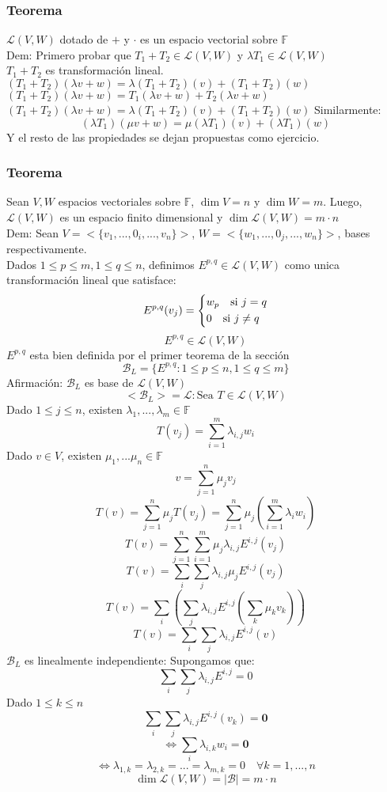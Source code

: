 \documentclass[11pt]{book}
\renewcommand{\vec}[1]{\mathbf{#1}}
\theoremstyle{definition}
\begin{document}
\subsubsection{Teorema}
$\mathcal{L}(V,W)$ dotado de $+$ y $\cdot$ es un espacio vectorial sobre $\mathbb{F}$\\
Dem: Primero probar que $T_1+T_2\in\mathcal{L}(V,W)$ y $\lambda T_1\in\mathcal{L}(V,W)$\\
$T_1+T_2$ es transformación lineal.\\
$(T_1+T_2)(\lambda v+w)=\lambda(T_1+T_2)(v)+(T_1+T_2)(w)$
$(T_1+T_2)(\lambda v+w)=T_1(\lambda v+w)+T_2(\lambda v+w)$
$(T_1+T_2)(\lambda v+w)=\lambda(T_1+T_2)(v)+(T_1+T_2)(w)$
Similarmente:
\[
(\lambda T_1)(\mu v+w)=\mu(\lambda T_1)(v)+(\lambda T_1)(w)
\]
Y el resto de las propiedades se dejan propuestas como ejercicio.
\subsubsection{Teorema}
Sean $V,W$ espacios vectoriales sobre $\mathbb{F}$, $\dim V=n$ y $\dim W=m$. Luego, $\mathcal{L}(V,W)$ es un espacio finito dimensional y $\dim\mathcal{L}(V,W)=m\cdot n$\\
Dem: Sean $V=<\{v_1,...,0_i,...,v_n\}>$, $W=<\{w_1,...,0_j,...,w_n\}>$, bases respectivamente.\\
Dados $1\leq p\leq m, 1\leq q\leq n$, definimos $E^{p,q}\in\mathcal{L}(V,W)$ como unica transformación lineal que satisface:
\[
E^{p,q}(v_j)=
\begin{dcases}
	w_p\quad\textrm{si }j=q\\
	0\quad\textrm{si } j\neq q
\end{dcases}
\]
\[
E^{p,q}\in\mathcal{L}(V,W)
\]
$E^{p,q}$ esta bien definida por el primer teorema de la sección
\[
\mathcal{B}_L=\{E^{p,q}:1\leq p\leq n,1\leq q\leq m\}
\]
Afirmación: $\mathcal{B}_L$ es base de $\mathcal{L}(V,W)$
\[
<\mathcal{B}_L>=\mathcal{L}:\textrm{Sea }T\in\mathcal{L}(V,W)
\]
Dado $1\leq j\leq n$, existen $\lambda_1,...,\lambda_m\in\mathbb{F}$
\[
T(v_j)=\sum^m_{i=1}\lambda_{i,j}w_i
\]
Dado $v\in V$, existen $\mu_1,...\mu_n\in\mathbb{F}$
\[
v=\sum^n_{j=1}\mu_jv_j
\]
\[
T(v)=\sum^n_{j=1}\mu_jT(v_j)=\sum^n_{j=1}\mu_j(\sum^m_{i=1}\lambda_iw_i)
\]
\[
T(v)=\sum^n_{j=1}\sum^m_{i=1}\mu_j\lambda_{i,j}E^{i,j}(v_j)
\]
\[
T(v)=\sum_i\sum_j\lambda_{i,j}\mu_jE^{i,j}(v_j)
\]
\[
T(v)=\sum_i\left(\sum_j\lambda_{i,j}E^{i,j}\left(\sum_k\mu_kv_k\right)\right)
\]
\[
T(v)=\sum_i\sum_j\lambda_{i,j}E^{i,j}(v)
\]
$\mathcal{B}_L$ es linealmente independiente: Supongamos que:
\[
\sum_i\sum_j\lambda_{i,j}E^{i,j}=0
\]
Dado $1\leq k\leq n$
\[
\sum_i\sum_j\lambda_{i,j}E^{i,j}(v_k)=\vec{0}
\]
\[
\iff \sum_i\lambda_{i,k}w_i=\vec{0}
\]
\[
\iff \lambda_{1,k}=\lambda_{2,k}=...=\lambda_{m,k}=0\quad \forall k=1,...,n
\]
\[
\dim\mathcal{L}(V,W)=|\mathcal{B}|=m\cdot n
\]
\end{document}

